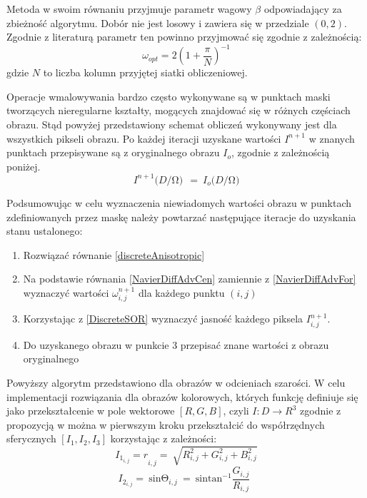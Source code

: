 \documentclass[12pt, twoside, openany]{report}
\theoremstyle{definition}
\begin{document}
Metoda w swoim równaniu przyjmuje parametr wagowy $\beta$ odpowiadający za zbieżność algorytmu. Dobór nie jest losowy i zawiera się w przedziale $(0,2)$. Zgodnie z literaturą parametr ten powinno przyjmować się zgodnie z zależnością:
\begin{equation}
{\omega }_{opt}=2{\left(1+\frac{\pi }{N}\right)}^{-1}
\label{BetaChoose}
\end{equation}
gdzie $N$ to liczba kolumn przyjętej siatki obliczeniowej. 
\par
Operacje wmalowywania bardzo często wykonywane są w punktach maski tworzących nieregularne kształty, mogących znajdować się w różnych częściach obrazu. Stąd powyżej przedstawiony schemat obliczeń wykonywany jest dla wszystkich pikseli obrazu. Po każdej iteracji uzyskane wartości $I^{n+1}$ w znanych punktach przepisywane są z oryginalnego obrazu $I_{o}$, zgodnie z zależnością poniżej.
\begin{equation}
I^{n+1}(D/\mathrm{\Omega }\mathrm{)\ }\ ={\ I}_o(D/\mathrm{\Omega }\mathrm{)}
\label{retrieveMask}
\end{equation}
\par
Podsumowując w celu wyznaczenia niewiadomych wartości obrazu w punktach zdefiniowanych przez maskę należy powtarzać następujące iteracje do uzyskania stanu ustalonego:
\begin{enumerate}
\item
Rozwiązać równanie \eqref{discreteAnisotropic} 
\item
Na podstawie równania \eqref{NavierDiffAdvCen} zamiennie z \eqref{NavierDiffAdvFor} wyznaczyć wartości $\omega_{i,j}^{n+1}$ dla każdego punktu $(i,j)$ 
\item
Korzystając z \eqref{DiscreteSOR} wyznaczyć jasność każdego piksela $I_{i,j}^{n+1}$.
\item
Do uzyskanego obrazu w punkcie 3 przepisać znane wartości z obrazu oryginalnego
\end{enumerate}
Powyższy algorytm przedstawiono dla obrazów w odcieniach szarości. W celu implementacji rozwiązania dla obrazów kolorowych, których funkcję definiuje się jako przekształcenie w pole wektorowe $[R,G,B]$, czyli $I:D\to R^3$  zgodnie z propozycją w \cite{fishelov2006image} można w pierwszym kroku przekształcić do współrzędnych sferycznych $\left[I_{1},I_{2},I_{3} \right]$ korzystając z zależności:
\begin{equation}
{I_{1_{i,j}}=r}_{i,j}=\ \sqrt{R^2_{i,j}+G^2_{i,j}+B^2_{i,j}}
\label{TIone}
\end{equation}
\begin{equation}
I_{2_{i,j}}=\ {\mathrm{sin} {\mathrm{\Theta }}_{i,j}\ }=\ {\mathrm{sin} {{\mathrm{tan}}^{-1} \frac{G_{i,j}}{R_{i,j}}\ }\ } 
\label{TItwo}
\end{equation}
\end{document}
